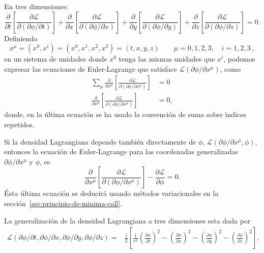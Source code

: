 En tres dimensiones:
\begin{equation}
  \label{eq:eelcalls1m}
\frac{\partial}{\partial t}
  \left[
    \frac{\partial\mathcal{L}}{\partial
      (\partial\phi/\partial t)}
  \right]+\frac{\partial}{\partial x}
  \left[
    \frac{\partial\mathcal{L}}{\partial
      (\partial\phi/\partial x)}
  \right]+\frac{\partial}{\partial y}
  \left[
    \frac{\partial\mathcal{L}}{\partial
      (\partial\phi/\partial y)}
  \right]+\frac{\partial}{\partial z}
  \left[
    \frac{\partial\mathcal{L}}{\partial
      (\partial\phi/\partial z)}
  \right]=0.
\end{equation}
Definiendo
\begin{equation}
  \label{eq:xmu}
  x^\mu=(x^0,x^i)=(x^0,x^1,x^2,x^3)=(t,x,y,z) \qquad \mu=0,1,2,3,\quad i=1,2,3\,,
\end{equation}
en un sistema de unidades donde $x^0$ tenga las mismas unidades que
$x^i$, podemos expresar las ecuaciones de Euler-Lagrange que satisface
$\mathcal{L}(\partial\phi/\partial x^\mu)$, como
\begin{align*}
 \sum_\mu\frac{\partial}{\partial x^\mu}
  \left[
    \frac{\partial\mathcal{L}}{\partial
      (\partial\phi/\partial x^\mu)}
  \right]&=0\\
 \frac{\partial}{\partial x^\mu}
  \left[
    \frac{\partial\mathcal{L}}{\partial
      (\partial\phi/\partial x^\mu)}
  \right]&=0,
\end{align*}
donde, en la \'ultima ecuaci\'on se ha usado la convenci\'on de suma sobre
\'\i ndices repetidos. 

Si la densidad Lagrangiana depende tambi\'en directamente de $\phi$,
$\mathcal{L}(\partial\phi/\partial x^\mu,\phi)$, entonces la ecuaci\'on de Euler-Lagrange para
las coordenadas generalizadas  $\partial\phi/\partial x^\mu$ y $\phi$, es
\begin{equation}
\label{eq:eelcallf}
 \frac{\partial}{\partial x^\mu}
  \left[
    \frac{\partial\mathcal{L}}{\partial
      (\partial\phi/\partial x^\mu)}
  \right]-\frac{\partial\mathcal{L}}{\partial\phi}=0.
\end{equation}
\'Esta \'ultima ecuaci\'on se deducir\'a usando m\'etodos variacionales en la
secci\'on~\ref{sec:principio-de-minima-call}.

\begin{frame}
La generalización de la densidad Lagrangiana a tres dimensiones esta dada por
\begin{align}
  \label{eq:dlc3d}
  \mathcal{L}(\partial\phi/\partial t,\partial\phi/\partial x,\partial\phi/\partial y,\partial\phi/\partial z)
=&\frac{1}{2}
\left[
  \frac{1}{v^2}\left(\frac{\partial\phi}{\partial t}\right)^2-\left(\frac{\partial\phi}{\partial x}\right)^2-\left(\frac{\partial\phi}{\partial y}\right)^2-\left(\frac{\partial\phi}{\partial z}\right)^2
\right],
\end{align}

\end{frame}

